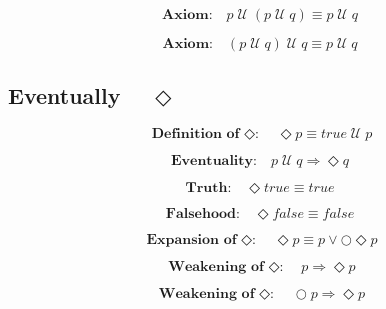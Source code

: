 \documentclass[fleqn, leqno]{article}
\newcommand{\Until}{\;\mathcal{U}\;}
\newcommand{\Next}{\bigcirc}
\newcommand{\Event}{\Diamond}
\newcommand{\spacer}{\vspace{-30pt}}
\newcommand{\firstspacer}{\vspace{-26pt}}
\begin{document}
\spacer

\begin{equation}\label{E:untilIdem}
\textbf{Axiom:}\quad p \Until (p \Until q) \equiv p \Until q
\end{equation}

\spacer

\begin{equation}\label{E:untilIdemR}
\textbf{Axiom:}\quad (p \Until q) \Until q \equiv p \Until q
\end{equation}

\subsection*{Eventually $\quad\Event$}

\begin{equation}\label{E:defEvent}
\textbf{Definition of $\Event$:}\quad \Event p \equiv true \Until p
\end{equation}

\firstspacer

\begin{equation}\label{E:eventuality}
\textbf{Eventuality:}\quad p \Until q \Rightarrow \Event q
\end{equation}

\spacer

\begin{equation}\label{E:eventTrue}
\textbf{Truth:}\quad \Event true \equiv true
\end{equation}

\spacer

\begin{equation}\label{E:eventFalse}
\textbf{Falsehood:}\quad \Event false \equiv false
\end{equation}

\spacer

\begin{equation}\label{E:expansionEvent}
\textbf{Expansion of $\Event$:}\quad \Event p \equiv p \lor \Next\Event p
\end{equation}

\spacer

\begin{equation}\label{E:impEvent}
\textbf{Weakening of $\Event$:}\quad p \Rightarrow \Event p
\end{equation}

\spacer

\begin{equation}\label{E:nextEvent}
\textbf{Weakening of $\Event$:}\quad \Next p \Rightarrow \Event p
\end{equation}
\end{document}
